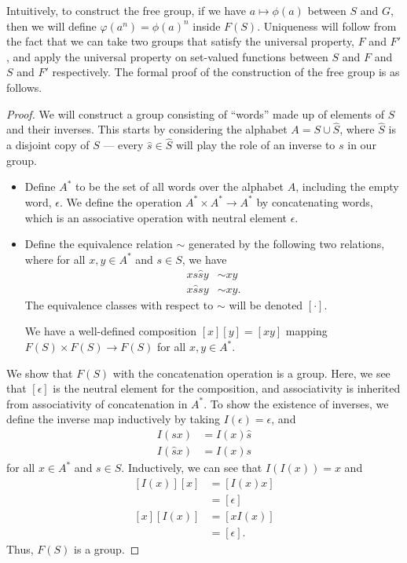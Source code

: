 Intuitively, to construct the free group, if we have $a\mapsto \phi(a)$ between $S$ and $G$, then we will define $\varphi\left(a^n\right) = \phi(a)^n$ inside $F(S)$. Uniqueness will follow from the fact that we can take two groups that satisfy the universal property, $F$ and $F'$, and apply the universal property on set-valued functions between $S$ and $F$ and $S$ and $F'$ respectively. The formal proof of the construction of the free group is as follows.
\begin{proof}
  We will construct a group consisting of ``words'' made up of elements of $S$ and their inverses. This starts by considering the alphabet $A = S\cup \widehat{S}$, where $\widehat{S}$ is a disjoint copy of $S$ --- every $\hat{s}\in \widehat{S}$ will play the role of an inverse to $s$ in our group.
  \begin{itemize}
    \item Define $A^{\ast}$ to be the set of all words over the alphabet $A$, including the empty word, $\epsilon$. We define the operation $A^{\ast}\times A^{\ast}\rightarrow A^{\ast}$ by concatenating words, which is an associative operation with neutral element $\epsilon$.
    \item Define the equivalence relation $\sim$ generated by the following two relations, where for all $x,y\in A^{\ast}$ and $s\in S$, we have
      \begin{align*}
        xs\hat{s}y &\sim xy\\
        x\hat{s}sy &\sim xy.
      \end{align*}
      The equivalence classes with respect to $\sim$ will be denoted $\left[\cdot\right]$.\newline

      We have a well-defined composition $\left[x\right]\left[y\right] = \left[xy\right]$ mapping $F(S) \times F(S) \rightarrow F(S)$ for all $x,y\in A^{\ast}$.
  \end{itemize}
  We show that $F(S)$ with the concatenation operation is a group. Here, we see that $\left[\epsilon\right]$ is the neutral element for the composition, and associativity is inherited from associativity of concatenation in $A^{\ast}$. To show the existence of inverses, we define the inverse map inductively by taking $I\left(\epsilon\right) = \epsilon$, and
  \begin{align*}
    I\left(sx\right) &= I(x)\hat{s}\\
    I\left(\hat{s}x\right) &= I(x)s
  \end{align*}
  for all $x\in A^{\ast}$  and $s\in S$. Inductively, we can see that $I\left(I\left(x\right)\right) = x$ and
  \begin{align*}
    \left[I(x)\right]\left[x\right] &= \left[I(x)x\right]\\
                                    &= \left[\epsilon\right]\\
    \left[x\right]\left[I(x)\right] &= \left[xI(x)\right]\\
                                    &= \left[\epsilon\right].
  \end{align*}
  Thus, $F(S)$ is a group.\newline


\end{proof}
